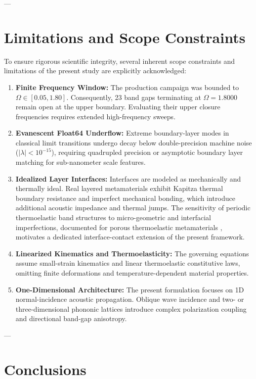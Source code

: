 \documentclass[11pt,a4paper]{article}
\begin{document}
---

\section{Limitations and Scope Constraints}
\label{sec:limitations}

To ensure rigorous scientific integrity, several inherent scope constraints and limitations of the present study are explicitly acknowledged:
\begin{enumerate}
    \item \textbf{Finite Frequency Window:} The production campaign was bounded to $\Omega \in [0.05, 1.80]$. Consequently, 23 band gaps terminating at $\Omega = 1.8000$ remain open at the upper boundary. Evaluating their upper closure frequencies requires extended high-frequency sweeps.
    \item \textbf{Evanescent Float64 Underflow:} Extreme boundary-layer modes in classical limit transitions undergo decay below double-precision machine noise ($|\lambda| < 10^{-15}$), requiring quadrupled precision or asymptotic boundary layer matching for sub-nanometer scale features.
    \item \textbf{Idealized Layer Interfaces:} Interfaces are modeled as mechanically and thermally ideal. Real layered metamaterials exhibit Kapitza thermal boundary resistance and imperfect mechanical bonding, which introduce additional acoustic impedance and thermal jumps. The sensitivity of periodic thermoelastic band structures to micro-geometric and interfacial imperfections, documented for porous thermoelastic metamaterials \cite{hosseini2025porosity}, motivates a dedicated interface-contact extension of the present framework.
    \item \textbf{Linearized Kinematics and Thermoelasticity:} The governing equations assume small-strain kinematics and linear thermoelastic constitutive laws, omitting finite deformations and temperature-dependent material properties.
    \item \textbf{One-Dimensional Architecture:} The present formulation focuses on 1D normal-incidence acoustic propagation. Oblique wave incidence and two- or three-dimensional phononic lattices introduce complex polarization coupling and directional band-gap anisotropy.
\end{enumerate}

---

\section{Conclusions}
\label{sec:conclusions}
\end{document}
